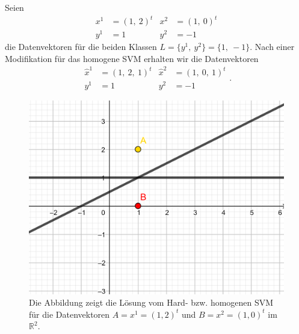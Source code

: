 \begin{beispiel}
\label{bsp-homg-nequ-hard}
Seien
$$
\begin{aligned}
	x^1 &= (1,\ 2)^t  &x^2  &= (1,\ 0)^t \\
	y^1 &= 1 		  &y^2 &= -1
\end{aligned}
$$
die Datenvektoren für die beiden Klassen $L=\{ y^1,\ y^2 \} = \{1,\ -1 \}$. Nach einer Modifikation für das homogene SVM erhalten wir 
die Datenvektoren
$$
\begin{aligned}
	\hat{x}^1 &= (1,\ 2,\ 1)^t &\hat{x}^2 &= (1,\ 0,\ 1)^t \\
	 y^1 &= 1					 &y^2 &= -1
\end{aligned}.
$$


\begin{figure}[htbp]
	\centering
	\includegraphics{abbildungen/homogen.png}
	\caption{Die Abbildung zeigt die Lösung vom Hard- bzw. homogenen SVM für die Datenvektoren $A=x^1 = (1, 2)^t$ und $B=x^2 = (1,0)^t$ im $\mathbb{R}^2$.}
	\label{img:hardvssoft}
\end{figure}


\end{beispiel}
